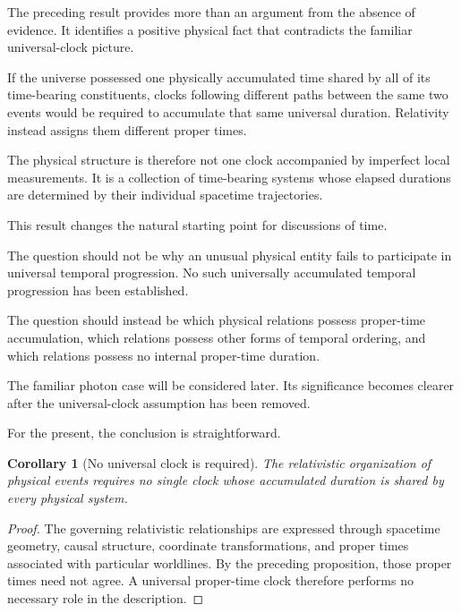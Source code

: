 \documentclass[12pt,onecolumn]{article}
\newtheorem{corollary}[proposition]{Corollary}
\begin{document}
The preceding result provides more than an argument from the absence of evidence. It identifies a positive physical fact that contradicts the familiar universal-clock picture.

If the universe possessed one physically accumulated time shared by all of its time-bearing constituents, clocks following different paths between the same two events would be required to accumulate that same universal duration. Relativity instead assigns them different proper times.

The physical structure is therefore not one clock accompanied by imperfect local measurements. It is a collection of time-bearing systems whose elapsed durations are determined by their individual spacetime trajectories.

This result changes the natural starting point for discussions of time.

The question should not be why an unusual physical entity fails to participate in universal temporal progression. No such universally accumulated temporal progression has been established.

The question should instead be which physical relations possess proper-time accumulation, which relations possess other forms of temporal ordering, and which relations possess no internal proper-time duration.

The familiar photon case will be considered later. Its significance becomes clearer after the universal-clock assumption has been removed.

For the present, the conclusion is straightforward.

\begin{corollary}[No universal clock is required]

The relativistic organization of physical events requires no single clock whose accumulated duration is shared by every physical system.

\end{corollary}

\begin{proof}

The governing relativistic relationships are expressed through spacetime geometry, causal structure, coordinate transformations, and proper times associated with particular worldlines. By the preceding proposition, those proper times need not agree. A universal proper-time clock therefore performs no necessary role in the description.

\end{proof}
\end{document}
